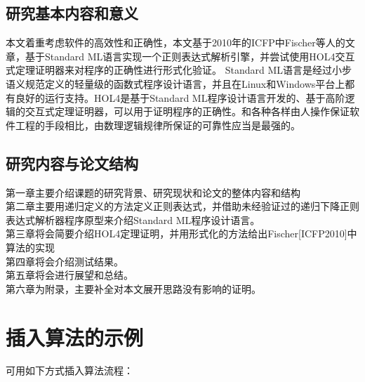 \documentclass[openany,oneside]{book}
\theoremstyle{definition}
\theoremstyle{definition}
\begin{document}
\section{研究基本内容和意义}
	本文着重考虑软件的高效性和正确性，本文基于2010年的ICFP中Fischer等人的文章，基于Standard ML语言实现一个正则表达式解析引擎，并尝试使用HOL4交互式定理证明器来对程序的正确性进行形式化验证。 Standard ML语言是经过小步语义规范定义的轻量级的函数式程序设计语言，并且在Linux和Windows平台上都有良好的运行支持。HOL4是基于Standard ML程序设计语言开发的、基于高阶逻辑的交互式定理证明器，可以用于证明程序的正确性。和各种各样由人操作保证软件工程的手段相比，由数理逻辑规律所保证的可靠性应当是最强的。

\section{研究内容与论文结构}

	\indent 第一章主要介绍课题的研究背景、研究现状和论文的整体内容和结构\\
	\indent 第二章主要用递归定义的方法定义正则表达式，并借助未经验证过的递归下降正则表达式解析器程序原型来介绍Standard ML程序设计语言。\\
	\indent 第三章将会简要介绍HOL4定理证明，并用形式化的方法给出Fischer[ICFP2010]中算法的实现\\
	\indent 第四章将会介绍测试结果。\\
	\indent 第五章将会进行展望和总结。\\
	\indent 第六章为附录，主要补全对本文展开思路没有影响的证明。

\chapter{插入算法的示例}

可用如下方式插入算法流程：
\end{document}
